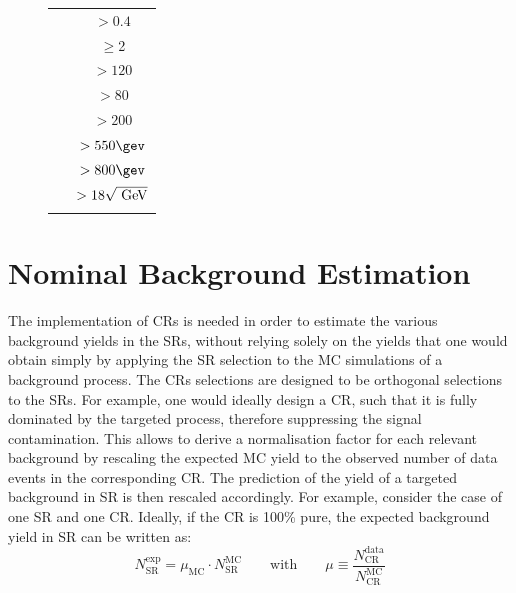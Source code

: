 \begin{figure}[!htb]
\begin{minipage}[!htb]{.5\textwidth}
\begin{tabular}{lc}
							   \toprule
							   \dphijetthreemet  & $>0.4$             \\ %
							   \nBJet   & $\geq$2            \\     %
							   \mantikteightzero & $>120$ \gev        \\     %
							   \mantikteightone  & $>80$ \gev         \\     %
							   \mtbmin\          & $>200$ \gev        \\     %
							   \met\             & $> 550 \gev$       \\     %
							   \HT               & $>800 \gev$        \\     %
							   \htsig            & $> 18 \sqrt{\GeV}$ \\     
							   \bottomrule
							   \label{tab:SignalRegionE}
							\end{tabular}
					\end{minipage}
				\end{figure}





	\section{Nominal Background Estimation}
	\label{sec:bkgest}

		The implementation of \acp{CR} is needed in order to estimate the various background yields in the \acp{SR}, without relying solely on the yields that one would obtain simply by applying the \ac{SR} selection to the \ac{MC} simulations of a background process. The \acp{CR} selections are designed to be orthogonal selections to the \acp{SR}. For example, one would ideally design a \ac{CR}, such that it is fully dominated by the targeted process, therefore suppressing the signal contamination. This allows to derive a normalisation factor for each relevant background by rescaling the expected \ac{MC} yield to the observed number of data events in the corresponding \ac{CR}. The prediction of the yield of a targeted background in \ac{SR} is then rescaled accordingly. For example, consider the case of one \ac{SR} and one \ac{CR}. Ideally, if the \ac{CR} is 100\% pure, the expected background yield in \ac{SR} can be written as:
		\begin{equation}
			N_{\mathrm{SR}}^{\mathrm{exp}} = \mu_{\mathrm{MC}} \cdot N_{\mathrm{SR}}^{\mathrm{MC}} \qquad \mathrm{with}\qquad \mu \equiv \frac{N_{\mathrm{CR}}^{\mathrm{data}}}{N_{\mathrm{CR}}^{\mathrm{MC}}}
		\label{eq:exp_bkgyield}
		\end{equation}

